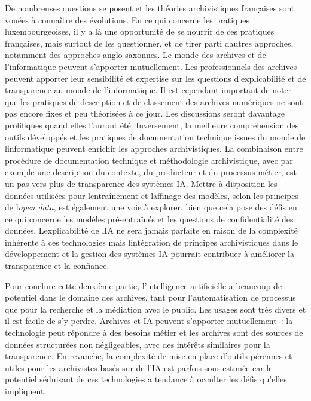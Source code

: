 	De nombreuses questions se posent et les théories archivistiques françaises sont vouées à connaître des évolutions. En ce qui
	concerne les pratiques luxembourgeoises, il y a là une opportunité de se
	nourrir de ces pratiques françaises, mais surtout de les questionner, et
	de tirer parti d\textquotesingle autres approches, notamment des
	approches anglo-saxonnes. Le monde des archives et de l'informatique
	peuvent s'apporter mutuellement. Les professionnels des archives peuvent
	apporter leur sensibilité et expertise sur les questions d'explicabilité
	et de transparence au monde de l'informatique. Il est cependant
	important de noter que les pratiques de description et de classement des
	archives numériques ne sont pas encore fixes et peu théorisées à ce
	jour. Les discussions seront davantage prolifiques quand elles l'auront été. Inversement, la meilleure compréhension des outils développés et
	les pratiques de documentation technique issues du monde de
	l\textquotesingle informatique peuvent enrichir les approches
	archivistiques. La combinaison entre procédure de documentation technique et
	méthodologie archivistique, avec par exemple une description du contexte,
	du producteur et du processus métier, est un pas vers plus de
	transparence des systèmes IA. Mettre à disposition les données utilisées
	pour l\textquotesingle entraînement et l\textquotesingle affinage des
	modèles, selon les principes de l\textquotesingle \emph{open data}, est
	également une voie à explorer, bien que cela pose des défis en ce qui
	concerne les modèles pré-entraînés et les questions de confidentialité
	des données. L\textquotesingle explicabilité de l\textquotesingle IA ne
	sera jamais parfaite en raison de la complexité inhérente à ces
	technologies mais l\textquotesingle intégration de principes
	archivistiques dans le développement et la gestion des systèmes IA
	pourrait contribuer à améliorer la transparence et la confiance.\newline
	

	Pour conclure cette deuxième partie, l'intelligence artificielle a
	beaucoup de potentiel dans le domaine des archives, tant pour
	l'automatisation de processus que pour la recherche et la médiation avec
	le public. Les usages sont très divers et il est facile de s'y perdre.
	Archives et IA peuvent s'apporter mutuellement~: la technologie peut répondre à
	des besoins métier et les archives sont des sources de données
	structurées non négligeables, avec des intérêts similaires pour la
	transparence. En revanche, la complexité de mise en place d'outils
	pérennes et utiles pour les archivistes basés sur de l'IA est parfois
	sous-estimée car le potentiel séduisant de ces technologies a tendance à
	occulter les défis qu'elles impliquent.
	
